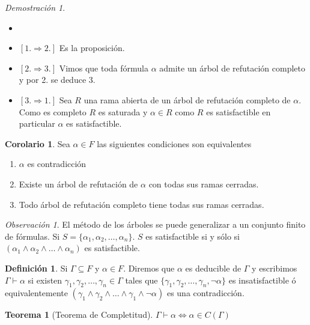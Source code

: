 \documentclass[a4paper,11pt]{article}
\theoremstyle{definition}
\newtheorem{defn}{Definición}[section]
\newtheorem{coro}{Corolario}[section]
\newtheorem{teor}{Teorema}[section]
\theoremstyle{remark}
\newtheorem*{remk}{Observación}
\newtheorem*{demo}{Demostración}
\begin{document}
\begin{demo}
 \begin{itemize}
  \item[]
  
  \item[] $[1. \Rightarrow 2.]$ Es la proposición.
  
  \item[] $[2. \Rightarrow 3.]$ Vimos que toda fórmula $\alpha$ admite un árbol de
  refutación completo y por 2. se deduce 3.
  
  \item[] $[3. \Rightarrow 1.]$ Sea $R$ una rama abierta de un árbol de refutación completo de
  $\alpha$. Como es completo $R$ es saturada y $\alpha \in R$ como $R$ es satisfactible
  en particular $\alpha$ es satisfactible.
 \end{itemize}
\end{demo}

\begin{coro}
 Sea $\alpha \in F$ las siguientes condiciones son equivalentes
 
 \begin{enumerate}
  \item $\alpha$ es contradicción
  
  \item Existe un árbol de refutación de $\alpha$ con todas sus ramas cerradas.
  
  \item Todo árbol de refutación completo tiene todas sus ramas cerradas.
 \end{enumerate}
\end{coro}

\begin{remk}
 El método de los árboles se puede generalizar a un conjunto finito de fórmulas.
 Si $S = \{\alpha_1, \alpha_2, \dots, \alpha_n\}$. $S$ es satisfactible si y sólo si
 $(\alpha_1 \land \alpha_2 \land \dots \land \alpha_n)$ es satisfactible.
\end{remk}

\begin{defn}
 Si $\Gamma \subseteq F$ y $\alpha \in F$. Diremos que $\alpha$ es deducible de $\Gamma$
 y escribimos $\Gamma \vdash \alpha$ si existen $\gamma_1, \gamma_2, \dots, \gamma_n \in \Gamma$
 tales que $\{\gamma_1, \gamma_2, \dots, \gamma_n, \lnot \alpha\}$ es insatisfactible
 ó equivalentemente $(\gamma_1 \land \gamma_2 \land \dots \land \gamma_1 \land \lnot \alpha)$
 es una contradicción.
\end{defn}

\begin{teor}[Teorema de Completitud]
 $\Gamma \vdash \alpha \iff \alpha \in C(\Gamma)$
\end{teor}
\end{document}
